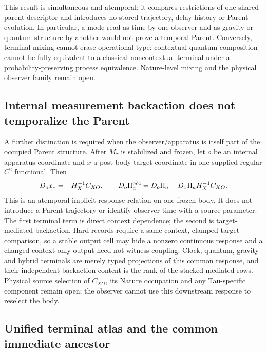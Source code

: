 \documentclass[11pt]{article}
\begin{document}
This result is simultaneous and atemporal: it compares restrictions of one
shared parent descriptor and introduces no stored trajectory, delay history
or Parent evolution. In particular, a mode read as time by one observer and
as gravity or quantum structure by another would not prove a temporal Parent.
Conversely, terminal mixing cannot erase operational type: contextual quantum
composition cannot be fully equivalent to a classical noncontextual terminal
under a probability-preserving process equivalence. Nature-level mixing and
the physical observer family remain open.

\subsection{Internal measurement backaction does not temporalize the Parent}

A further distinction is required when the observer/apparatus is itself part
of the occupied Parent structure. After $M_\tau$ is stabilized and frozen,
let $o$ be an internal apparatus coordinate and $x$ a post-body target
coordinate in one supplied regular $C^2$ functional. Then
\begin{equation}
 D_o x_*=-H_X^{-1}C_{XO},\qquad
 D_o\Pi_a^{\rm occ}
 =D_o\Pi_a-D_x\Pi_aH_X^{-1}C_{XO}.
 \label{eq:synthesis-generalized-backaction}
\end{equation}
This is an atemporal implicit-response relation on one frozen body. It does
not introduce a Parent trajectory or identify observer time with a source
parameter. The first terminal term is direct context dependence; the second
is target-mediated backaction. Hard records require a same-context,
clamped-target comparison, so a stable output cell may hide a nonzero
continuous response and a changed context-only output need not witness
coupling. Clock, quantum, gravity and hybrid terminals are merely typed
projections of this common response, and their independent backaction content
is the rank of the stacked mediated rows. Physical source selection of
$C_{XO}$, its Nature occupation and any Tau-specific component remain open;
the observer cannot use this downstream response to reselect the body.

\subsection{Unified terminal atlas and the common immediate ancestor}
\end{document}
